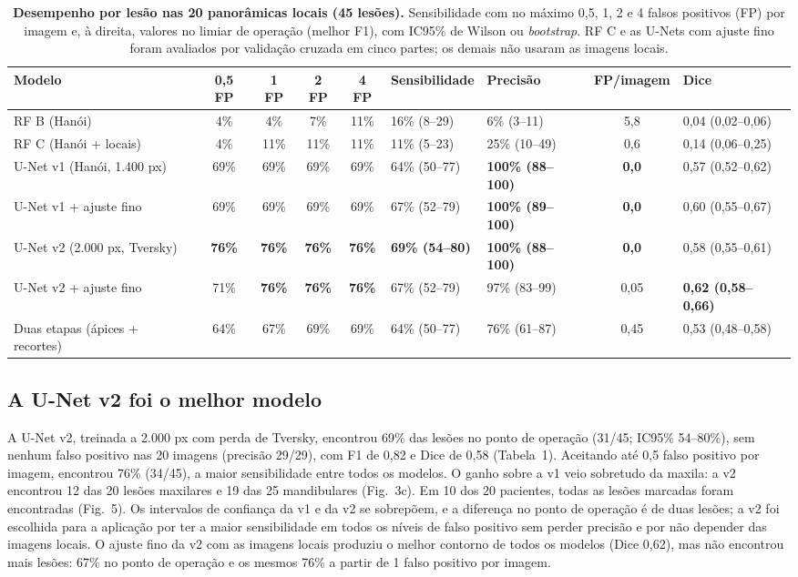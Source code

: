 \documentclass[twocolumn]{article}
\begin{document}
\begin{table}[!t]
\caption{\textbf{Desempenho por lesão nas 20 panorâmicas locais (45 lesões).} Sensibilidade com no máximo 0,5, 1, 2 e 4 falsos positivos (FP) por imagem e, à direita, valores no limiar de operação (melhor F1), com IC95\% de Wilson ou \textit{bootstrap}. RF C e as U-Nets com ajuste fino foram avaliados por validação cruzada em cinco partes; os demais não usaram as imagens locais.}
\centering\tablefont
\begin{tabularx}{\textwidth}{L *{4}{c} Y Y c Y}
\toprule
Modelo & 0,5 FP & 1 FP & 2 FP & 4 FP & Sensibilidade & Precisão & FP/imagem & Dice \\
\midrule
RF B (Hanói) & 4\% & 4\% & 7\% & 11\% & 16\% (8--29) & 6\% (3--11) & 5,8 & 0,04 (0,02--0,06) \\
RF C (Hanói + locais) & 4\% & 11\% & 11\% & 11\% & 11\% (5--23) & 25\% (10--49) & 0,6 & 0,14 (0,06--0,25) \\
U-Net v1 (Hanói, 1.400 px) & 69\% & 69\% & 69\% & 69\% & 64\% (50--77) & \textbf{100\% (88--100)} & \textbf{0,0} & 0,57 (0,52--0,62) \\
U-Net v1 + ajuste fino & 69\% & 69\% & 69\% & 69\% & 67\% (52--79) & \textbf{100\% (89--100)} & \textbf{0,0} & 0,60 (0,55--0,67) \\
U-Net v2 (2.000 px, Tversky) & \textbf{76\%} & \textbf{76\%} & \textbf{76\%} & \textbf{76\%} & \textbf{69\% (54--80)} & \textbf{100\% (88--100)} & \textbf{0,0} & 0,58 (0,55--0,61) \\
U-Net v2 + ajuste fino & 71\% & \textbf{76\%} & \textbf{76\%} & \textbf{76\%} & 67\% (52--79) & 97\% (83--99) & 0,05 & \textbf{0,62 (0,58--0,66)} \\
Duas etapas (ápices + recortes) & 64\% & 67\% & 69\% & 69\% & 64\% (50--77) & 76\% (61--87) & 0,45 & 0,53 (0,48--0,58) \\
\bottomrule
\end{tabularx}
\end{table}

\subsection{A U-Net v2 foi o melhor modelo}

A U-Net v2, treinada a 2.000 px com perda de Tversky, encontrou 69\% das lesões no ponto de operação (31/45; IC95\% 54--80\%), sem nenhum falso positivo nas 20 imagens (precisão 29/29), com F1 de 0,82 e Dice de 0,58 (Tabela~1). Aceitando até 0,5 falso positivo por imagem, encontrou 76\% (34/45), a maior sensibilidade entre todos os modelos. O ganho sobre a v1 veio sobretudo da maxila: a v2 encontrou 12 das 20 lesões maxilares e 19 das 25 mandibulares (Fig.~3c). Em 10 dos 20 pacientes, todas as lesões marcadas foram encontradas (Fig.~5). Os intervalos de confiança da v1 e da v2 se sobrepõem, e a diferença no ponto de operação é de duas lesões; a v2 foi escolhida para a aplicação por ter a maior sensibilidade em todos os níveis de falso positivo sem perder precisão e por não depender das imagens locais. O ajuste fino da v2 com as imagens locais produziu o melhor contorno de todos os modelos (Dice 0,62), mas não encontrou mais lesões: 67\% no ponto de operação e os mesmos 76\% a partir de 1 falso positivo por imagem.
\end{document}
